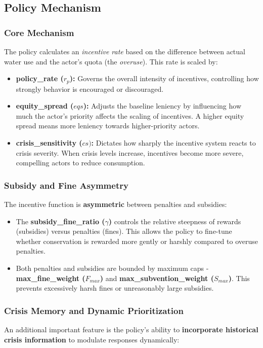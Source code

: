 \documentclass[a4paper, 12pt]{article}
\begin{document}
\subsection{Policy Mechanism}
\subsubsection*{Core Mechanism}
The policy calculates an \textit{incentive rate} based on the difference between actual water use and the actor’s quota 
(the \textit{overuse}). This rate is scaled by:

\begin{itemize}
    \item \textbf{policy\_rate ($r_p$):} Governs the overall intensity of incentives, controlling how strongly behavior 
    is encouraged or discouraged.
    \item \textbf{equity\_spread ($eqs$):} Adjusts the baseline leniency by influencing how much the actor’s priority 
    affects the scaling of incentives. A higher equity spread means more leniency towards higher-priority actors.
    \item \textbf{crisis\_sensitivity ($cs)$:} Dictates how sharply the incentive system reacts to crisis severity. 
    When crisis levels increase, incentives become more severe, compelling actors to reduce consumption.
\end{itemize}

\subsubsection*{Subsidy and Fine Asymmetry}
The incentive function is \textbf{asymmetric} between penalties and subsidies:

\begin{itemize}
    \item The \textbf{subsidy\_fine\_ratio ($\gamma$)} controls the relative steepness of rewards (subsidies) versus penalties 
    (fines). This allows the policy to fine-tune whether conservation is rewarded more gently or harshly compared to overuse penalties.
    \item Both penalties and subsidies are bounded by maximum caps - \textbf{max\_fine\_weight ($F_{max}$)} and 
    \textbf{max\_subvention\_weight ($S_{max}$)}. This prevents excessively harsh fines or unreasonably large subsidies.
\end{itemize}

\subsubsection*{Crisis Memory and Dynamic Prioritization}
An additional important feature is the policy’s ability to \textbf{incorporate historical crisis information} to 
modulate responses dynamically:
\end{document}
